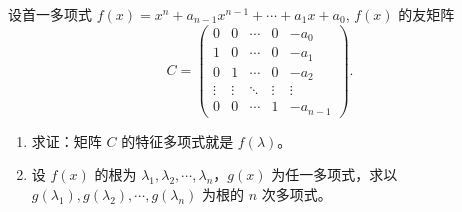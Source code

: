 \documentclass[../../main.tex]{subfiles}
\begin{document}
\begin{proposition}[友矩阵的特征多项式及特征值]\label{proposition:多项式的友阵的特征多项式与特征值}
设首一多项式 $f(x) = x^n + a_{n-1} x^{n-1} + \cdots + a_1 x + a_0$, $f(x)$ 的友矩阵
\[
C = \begin{pmatrix}
0 & 0 & \cdots & 0 & -a_0 \\
1 & 0 & \cdots & 0 & -a_1 \\
0 & 1 & \cdots & 0 & -a_2 \\
\vdots & \vdots & \ddots & \vdots & \vdots \\
0 & 0 & \cdots & 1 & -a_{n-1}
\end{pmatrix}.
\]
\begin{enumerate}[(1)]
\item 求证：矩阵 $C$ 的特征多项式就是 $f(\lambda)$。

\item 设 $f(x)$ 的根为 $\lambda_1, \lambda_2, \cdots, \lambda_n$，$g(x)$ 为任一多项式，求以 $g(\lambda_1), g(\lambda_2), \cdots, g(\lambda_n)$ 为根的 $n$ 次多项式。 
\end{enumerate}
\end{proposition}
\end{document}
